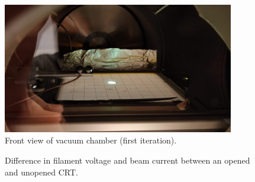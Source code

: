 \begin{figure}[h]
	\centering
	\includegraphics[width=0.9\textwidth]{./Chapters/beam-characterization/center_image}
	\caption{Front view of vacuum chamber (first iteration).}
	\label{fig:Front view of vacuum chamber (first iteration)}
\end{figure}


\begin{figure}[ht]
	\centering
	
	\begin{tikzpicture}
		
	\end{tikzpicture}
	
	\caption{Difference in filament voltage and beam current between an opened and unopened CRT.}
	\label{fig:Difference in filament voltage and beam current between an opened and unopened CRT}
\end{figure}







